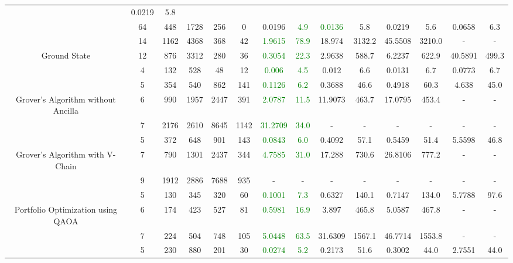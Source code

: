 \begin{table}[htb]
{\begin{tabular}{|c|c|c|c|c|c|c|c|c|c|c|c|c|c|}
 & 0.0219 & 5.8
 \\
 & 
64 & 448 & 1728 & 256 & 0
 & 0.0196 & \textcolor{green}{4.9}
 & \textcolor{green}{0.0136} & 5.8
 & 0.0219 & 5.6
 & 0.0658 & 6.3
 \\
\hline
 & 
14 & 1162 & 4368 & 368 & 42
 & \textcolor{green}{1.9615} & \textcolor{green}{78.9}
 & 18.974 & 3132.2
 & 45.5508 & 3210.0
 & - & -
 \\
Ground State & 
12 & 876 & 3312 & 280 & 36
 & \textcolor{green}{0.3054} & \textcolor{green}{22.3}
 & 2.9638 & 588.7
 & 6.2237 & 622.9
 & 40.5891 & 499.3
 \\
 & 
4 & 132 & 528 & 48 & 12
 & \textcolor{green}{0.006} & \textcolor{green}{4.5}
 & 0.012 & 6.6
 & 0.0131 & 6.7
 & 0.0773 & 6.7
 \\
\hline
 & 
5 & 354 & 540 & 862 & 141
 & \textcolor{green}{0.1126} & \textcolor{green}{6.2}
 & 0.3688 & 46.6
 & 0.4918 & 60.3
 & 4.638 & 45.0
 \\
Grover's Algorithm without Ancilla & 
6 & 990 & 1957 & 2447 & 391
 & \textcolor{green}{2.0787} & \textcolor{green}{11.5}
 & 11.9073 & 463.7
 & 17.0795 & 453.4
 & - & -
 \\
 & 
7 & 2176 & 2610 & 8645 & 1142
 & \textcolor{green}{31.2709} & \textcolor{green}{34.0}
 & - & -
 & - & -
 & - & -
 \\
\hline
 & 
5 & 372 & 648 & 901 & 143
 & \textcolor{green}{0.0843} & \textcolor{green}{6.0}
 & 0.4092 & 57.1
 & 0.5459 & 51.4
 & 5.5598 & 46.8
 \\
Grover's Algorithm with V-Chain & 
7 & 790 & 1301 & 2437 & 344
 & \textcolor{green}{4.7585} & \textcolor{green}{31.0}
 & 17.288 & 730.6
 & 26.8106 & 777.2
 & - & -
 \\
 & 
9 & 1912 & 2886 & 7688 & 935
 & - & -
 & - & -
 & - & -
 & - & -
 \\
\hline
 & 
5 & 130 & 345 & 320 & 60
 & \textcolor{green}{0.1001} & \textcolor{green}{7.3}
 & 0.6327 & 140.1
 & 0.7147 & 134.0
 & 5.7788 & 97.6
 \\
Portfolio Optimization using QAOA & 
6 & 174 & 423 & 527 & 81
 & \textcolor{green}{0.5981} & \textcolor{green}{16.9}
 & 3.897 & 465.8
 & 5.0587 & 467.8
 & - & -
 \\
 & 
7 & 224 & 504 & 748 & 105
 & \textcolor{green}{5.0448} & \textcolor{green}{63.5}
 & 31.6309 & 1567.1
 & 46.7714 & 1553.8
 & - & -
 \\
\hline
 & 
5 & 230 & 880 & 201 & 30
 & \textcolor{green}{0.0274} & \textcolor{green}{5.2}
 & 0.2173 & 51.6
 & 0.3002 & 44.0
 & 2.7551 & 44.0
 \\

\end{tabular}}
\end{table}
